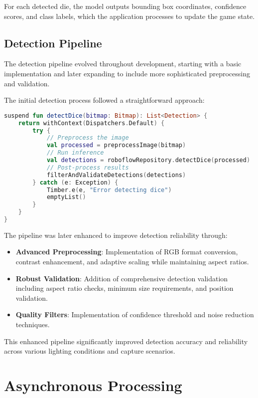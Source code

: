 For each detected die, the model outputs bounding box coordinates, confidence scores, and class labels, which the application processes to update the game state.

\subsection{Detection Pipeline}
The detection pipeline evolved throughout development, starting with a basic implementation and later expanding to include more sophisticated preprocessing and validation.

The initial detection process followed a straightforward approach:
\begin{lstlisting}[language=Kotlin, caption={Initial Dice Detection Pipeline}, label=lst:initial_dice_detection]
suspend fun detectDice(bitmap: Bitmap): List<Detection> {
    return withContext(Dispatchers.Default) {
        try {
            // Preprocess the image
            val processed = preprocessImage(bitmap)
            // Run inference
            val detections = roboflowRepository.detectDice(processed)
            // Post-process results
            filterAndValidateDetections(detections)
        } catch (e: Exception) {
            Timber.e(e, "Error detecting dice")
            emptyList()
        }
    }
}
\end{lstlisting}
\label{lst:initial_dice_detection}

The pipeline was later enhanced to improve detection reliability through:
\begin{itemize}
    \item \textbf{Advanced Preprocessing}: Implementation of RGB format conversion, contrast enhancement, and adaptive scaling while maintaining aspect ratios.
    \item \textbf{Robust Validation}: Addition of comprehensive detection validation including aspect ratio checks, minimum size requirements, and position validation.
    \item \textbf{Quality Filters}: Implementation of confidence threshold and noise reduction techniques.
\end{itemize}

This enhanced pipeline significantly improved detection accuracy and reliability across various lighting conditions and capture scenarios.

\section{Asynchronous Processing}

